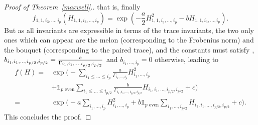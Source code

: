 \documentclass[pdftex]{sigma}
\numberwithin{equation}{section}
\theoremstyle{definition}
\begin{document}
\begin{proof}[Proof of Theorem~\ref{maxwell}.]
that is, finally
\[ f_{1,1,i_{3},\dots,i_p}(H_{1,1,i_{3},\dots,i_p}) = \exp\left(-\frac{a}{2} H_{1,1,i_{3},\dots,i_p}^2-bH_{1,1,i_{3},\dots,i_p}\right). \]
But as all invariants are expressible in terms of the trace invariants, the two only ones which can appear are the melon (corresponding to the Frobenius norm) and the bouquet (corresponding to the paired trace), and the constants must satisfy , $b_{i_1,i_1,\dots,i_{p/2},i_{p/2}}=\smash{\frac{b}{\Gamma_{i_1,i_1,\dots,i_{p/2},i_{p/2}} }}$ and $b_{i_1,\dots,i_p}=0$ otherwise, leading to
\begin{align*}
    f(H)={}& \exp \Bigg( -\sum_{i_1\leq\dots\leq i_p} \frac{a}{\Gamma_{i_1,\dots,i_p} } H_{i_{1},\dots,i_p}^2 \\
    &+ \mathds{1}_{p \text{ even}} \sum_{i_1 \leq\dots \leq i_{p/2}} \frac{b}{\Gamma_{i_1,i_1,\dots,i_{p/2},i_{p/2}} } H_{i_1,i_1,\dots,i_{p/2},i_{p/2}} +c \Bigg) \\
    ={}& \exp \Bigg( -a \sum_{i_1,\dots,i_p} H_{i_{1},\dots,i_p}^2 + b \mathds{1}_{p \text{ even}} \sum_{i_1,\dots, i_{p/2}} H_{i_1,i_1,\dots,i_{p/2},i_{p/2}} +c \Bigg).
\end{align*}
This concludes the proof.
\end{proof}
\end{document}
